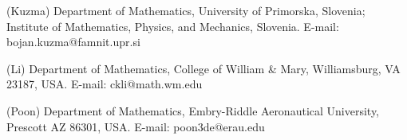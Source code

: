 \documentclass[11pt]{article}
\numberwithin{equation}{section}
\begin{document}
\noindent
(Kuzma) Department of Mathematics, University of Primorska, Slovenia; Institute of Mathematics,
Physics, and Mechanics, Slovenia. E-mail: bojan.kuzma@famnit.upr.si

\medskip\noindent
(Li) Department of Mathematics, College of William \& Mary, Williamsburg, VA 23187, USA.
E-mail: ckli@math.wm.edu

\medskip\noindent
(Poon) Department of Mathematics, Embry-Riddle Aeronautical University, Prescott AZ 86301,
USA. E-mail: poon3de@erau.edu
\end{document}
